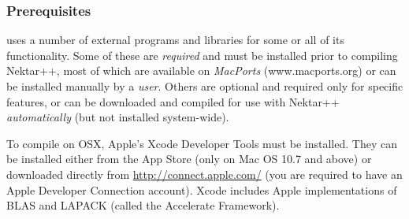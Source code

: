 \subsubsection{Prerequisites}
\nekpp uses a number of external programs and libraries for some or all of its
functionality. Some of these are \emph{required} and must be installed prior to
compiling Nektar++, most of which are available on \emph{MacPorts}
(www.macports.org) or can be installed manually by a \emph{user}. Others are
optional and required only for specific features, or can be downloaded and 
compiled for use with Nektar++ \emph{automatically} (but not installed
system-wide).

\begin{notebox}
To compile \nekpp on OSX, Apple's Xcode Developer Tools must be installed. They
can be installed either from the App Store (only on Mac OS 10.7 and above) or
downloaded directly from
\href{http://connect.apple.com/}{http://connect.apple.com/} 
(you are required to have an Apple Developer Connection account).
Xcode includes Apple implementations of BLAS and LAPACK (called the Accelerate
Framework).
\end{notebox}

